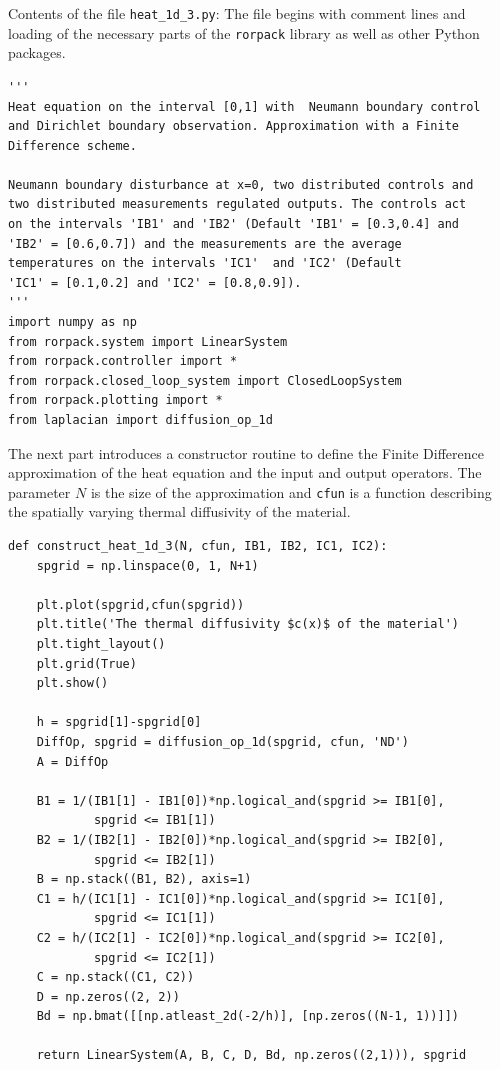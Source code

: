 \documentclass[11pt, a4paper]{amsart}
\theoremstyle{definition}
\numberwithin{equation}{section}
\begin{document}
Contents of the file \texttt{heat\_1d\_3.py}: The file begins with comment lines and loading of the necessary parts of the \texttt{rorpack} library as well as other Python packages.

\begin{lstlisting}
'''
Heat equation on the interval [0,1] with  Neumann boundary control
and Dirichlet boundary observation. Approximation with a Finite 
Difference scheme.

Neumann boundary disturbance at x=0, two distributed controls and
two distributed measurements regulated outputs. The controls act 
on the intervals 'IB1' and 'IB2' (Default 'IB1' = [0.3,0.4] and 
'IB2' = [0.6,0.7]) and the measurements are the average 
temperatures on the intervals 'IC1'  and 'IC2' (Default 
'IC1' = [0.1,0.2] and 'IC2' = [0.8,0.9]).
'''
import numpy as np
from rorpack.system import LinearSystem
from rorpack.controller import *
from rorpack.closed_loop_system import ClosedLoopSystem
from rorpack.plotting import *
from laplacian import diffusion_op_1d
\end{lstlisting}

The next part introduces a constructor routine to define the Finite Difference approximation of the heat equation and the input and output operators. The parameter $N$ is the size of the approximation and \texttt{cfun} is a function describing the spatially varying thermal diffusivity of the material.

\begin{lstlisting}
def construct_heat_1d_3(N, cfun, IB1, IB2, IC1, IC2):
    spgrid = np.linspace(0, 1, N+1)

    plt.plot(spgrid,cfun(spgrid))
    plt.title('The thermal diffusivity $c(x)$ of the material')
    plt.tight_layout()
    plt.grid(True)
    plt.show()

    h = spgrid[1]-spgrid[0]
    DiffOp, spgrid = diffusion_op_1d(spgrid, cfun, 'ND')
    A = DiffOp

    B1 = 1/(IB1[1] - IB1[0])*np.logical_and(spgrid >= IB1[0], 
            spgrid <= IB1[1])
    B2 = 1/(IB2[1] - IB2[0])*np.logical_and(spgrid >= IB2[0],
            spgrid <= IB2[1])
    B = np.stack((B1, B2), axis=1)
    C1 = h/(IC1[1] - IC1[0])*np.logical_and(spgrid >= IC1[0],
            spgrid <= IC1[1])
    C2 = h/(IC2[1] - IC2[0])*np.logical_and(spgrid >= IC2[0],
            spgrid <= IC2[1])
    C = np.stack((C1, C2))
    D = np.zeros((2, 2))
    Bd = np.bmat([[np.atleast_2d(-2/h)], [np.zeros((N-1, 1))]])

    return LinearSystem(A, B, C, D, Bd, np.zeros((2,1))), spgrid
 \end{lstlisting}
\end{document}
